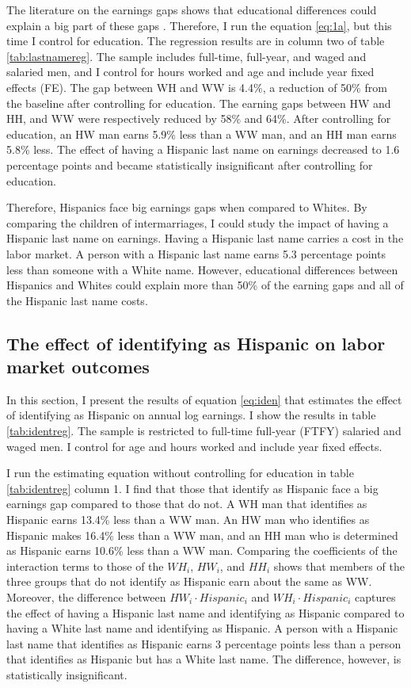 \documentclass{wptemp}
\begin{document}
The literature on the earnings gaps shows that educational differences could explain a big part of these gaps \citep{duncan2006hispanics, duncan2017complexity, duncan2018identifying, duncan2020new}. Therefore, I run the equation \ref{eq:1a}, but this time I control for education. The regression results are in column two of table \ref{tab:lastnamereg}. The sample includes full-time, full-year, and waged and salaried men, and I control for hours worked and age and include year fixed effects (FE). The gap between WH and WW is 4.4\%, a reduction of 50\% from the baseline after controlling for education. The earning gaps between HW and HH, and WW were respectively reduced by 58\% and 64\%. After controlling for education, an HW man earns 5.9\% less than a WW man, and an HH man earns 5.8\% less. The effect of having a Hispanic last name on earnings decreased to 1.6 percentage points and became statistically insignificant after controlling for education.

Therefore, Hispanics face big earnings gaps when compared to Whites. By comparing the children of intermarriages, I could study the impact of having a Hispanic last name on earnings. Having a Hispanic last name carries a cost in the labor market. A person with a Hispanic last name earns 5.3 percentage points less than someone with a White name. However, educational differences between Hispanics and Whites could explain more than 50\% of the earning gaps and all of the Hispanic last name costs.

\subsection{The effect of identifying as Hispanic on labor market outcomes}

In this section, I present the results of equation \ref{eq:iden} that estimates the effect of identifying as Hispanic on annual log earnings. I show the results in table \ref{tab:identreg}. The sample is restricted to full-time full-year (FTFY) salaried and waged men. I control for age and hours worked and include year fixed effects.

I run the estimating equation without controlling for education in table \ref{tab:identreg} column 1. I find that those that identify as Hispanic face a big earnings gap compared to those that do not. A WH man that identifies as Hispanic earns 13.4\% less than a WW man. An HW man who identifies as Hispanic makes 16.4\% less than a WW man, and an HH man who is determined as Hispanic earns 10.6\% less than a WW man. Comparing the coefficients of the interaction terms to those of the $WH_{i}$, $HW_{i}$, and $HH_{i}$ shows that members of the three groups that do not identify as Hispanic earn about the same as WW.
Moreover, the difference between $HW_{i} \cdot Hispanic_{i}$  and $WH_{i} \cdot Hispanic_{i}$ captures the effect of having a Hispanic last name and identifying as Hispanic compared to having a White last name and identifying as Hispanic. A person with a Hispanic last name that identifies as Hispanic earns 3 percentage points less than a person that identifies as Hispanic but has a White last name. The difference, however, is statistically insignificant.
\end{document}
